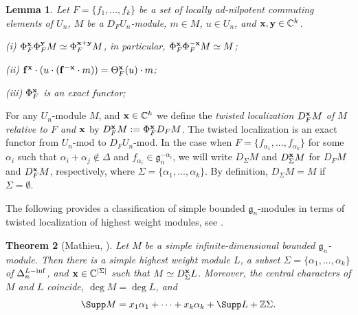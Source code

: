 \documentclass[12pt]{amsart}
\def\gg{\mathfrak{g}}
\newtheorem{thm}{Theorem}[section]
\newtheorem{lem}[thm]{Lemma}
\begin{document}
\begin{lem} \label{lemma-conj} Let $F = \{ f_1,...,f_k\}$ be a set of locally ad-nilpotent commuting elements of $U_n$, $M$   be  a ${D}_{F} {U_n}$-module, $m \in M$, $u \in  U_n$, and  ${\bf x}, {\bf y} \in {\mathbb C}^k$. 

{\rm(i)}  $\Phi^{\bf x}_{F} \Phi^{\bf y}_{F}M   \simeq \Phi^{\bf{x+y}}_{F} M$, in particular, $\Phi^{\bf x}_{F}
\Phi^{-\bf{x}}_{F} M \simeq M$;


{\rm(ii)}   ${\bf f}^{\bf x} \cdot ( u \cdot ({\bf f}^{-{\bf x}} \cdot m) ) = \Theta_{F}^{\bf x}(u) \cdot m$;

{\rm(iii)}  $\Phi^{\bf x}_{F}$ is an exact functor;

 \end{lem}




For any $U_n$-module $M$, and ${\bf x} \in {\mathbb C}^k $ we define
the {\it twisted localization ${D}_{F}^{\bf x} M$ of $M$
relative to $F$ and $\bf x$} by ${D}_{F}^{\bf x} M:=
\Phi^{\bf x}_{F} {D}_{F} M $. The twisted localization is an exact functor from $U_n$-mod to $D_F U_n$-mod. In the case when $F = \{f_{\alpha_1},...,f_{\alpha_k} \}$ for some $\alpha_i$ such that $\alpha_i + \alpha_j \notin \Delta$ and  $f_{\alpha_i} \in \gg_n^{-\alpha_i}$, we will write ${D}_{\Sigma}M$ and ${D}_{\Sigma}^{\bf x} M$ for ${D}_{F} M$ and ${D}_{F}^{\bf x} M$, respectively, where $\Sigma = \{\alpha_1,...,\alpha_k \}$. By definition, ${D}_{\Sigma} M = M$ if $\Sigma = \emptyset$.

 The following provides a classification of  simple bounded $\gg_n$-modules in terms of twisted localization of highest weight modules, see  \cite[Theorem 13.3]{M}. 

\begin{thm}[Mathieu, \cite{M}] \label{thm-clas-bounded}
Let $M$ be a simple infinite-dimensional bounded $\gg_n$-module. Then there is a simple highest weight module $L$, a subset $\Sigma = \{ \alpha_1,...,\alpha_k\}$ of $\Delta_n^{L-{\rm inf}}$, and ${\bf x} \in {\mathbb C}^{|\Sigma|}$ such that $M \simeq {D}_{\Sigma}^{\bf x} L$. Moreover, the central characters of $M$ and $L$ coincide, $\deg M = \deg L$, and 
$$
\Supp M =  x_1\alpha_1+\cdots + x_k \alpha_k +  \Supp L + {\mathbb Z} \Sigma.
$$
\end{thm}
\end{document}
